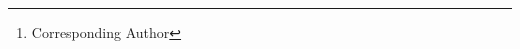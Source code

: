 \documentclass[letterpaper]{article} %
\author{
    Qiyang Li\textsuperscript{\rm 1},
    Rui Kong\textsuperscript{\rm 1},%
    Yuchen Li\textsuperscript{\rm 1}\thanks{Corresponding Author},
    Hengyi Cai\textsuperscript{\rm 1},
    Shuaiqiang Wang\textsuperscript{\rm 1},
    Linghe Kong\textsuperscript{\rm 2},\\
    Guihai Chen\textsuperscript{\rm 2},
    Dawei Yin\textsuperscript{\rm 1}
}
\begin{document}
\maketitle






\FloatBarrier










% 
\end{document}
